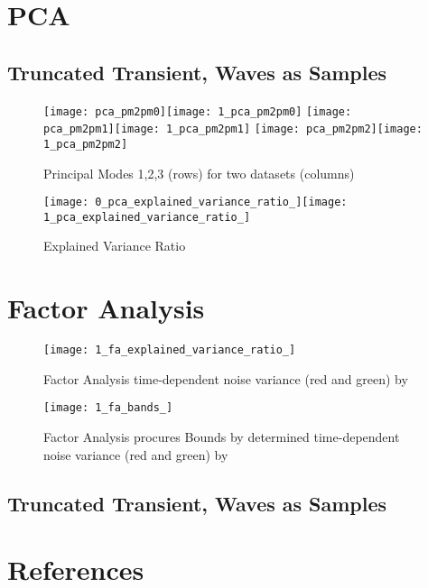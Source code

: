 \documentclass{article}
\begin{document}
\section{PCA}

\subsection{Truncated Transient, Waves as Samples}

\begin{figure}
	\centering
	\texttt{[image: pca\_pm2pm0]}\texttt{[image: 1\_pca\_pm2pm0]}	\texttt{[image: pca\_pm2pm1]}\texttt{[image: 1\_pca\_pm2pm1]}
	\texttt{[image: pca\_pm2pm2]}\texttt{[image: 1\_pca\_pm2pm2]}
	\caption{Principal Modes 1,2,3 (rows) for two datasets (columns)}
	\label{fig:1pcapm2pm0}
\end{figure}




\begin{figure}
	\centering
	\texttt{[image: 0\_pca\_explained\_variance\_ratio\_]}\texttt{[image: 1\_pca\_explained\_variance\_ratio\_]}
	\caption{Explained Variance Ratio}
	\label{fig:0pcaexplainedvarianceratio}
\end{figure}





















\section{Factor Analysis}

\begin{figure}
	\centering
	\texttt{[image: 1\_fa\_explained\_variance\_ratio\_]}
	\caption{Factor Analysis time-dependent noise variance (red and green) by }
	\label{fig:1faexplainedvarianceratio}
\end{figure}

\begin{figure}
	\centering
	\texttt{[image: 1\_fa\_bands\_]}
	\caption{Factor Analysis procures Bounds by determined time-dependent noise variance (red and green) by }
	\label{fig:1fabands}
\end{figure}


\subsection{Truncated Transient, Waves as Samples}



\section{References}
\end{document}

